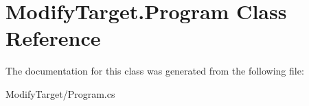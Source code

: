 \hypertarget{class_modify_target_1_1_program}{\section{Modify\-Target.\-Program Class Reference}
\label{class_modify_target_1_1_program}
}


The documentation for this class was generated from the following file\-:\begin{DoxyCompactItemize}
\item 
Modify\-Target/Program.\-cs\end{DoxyCompactItemize}
